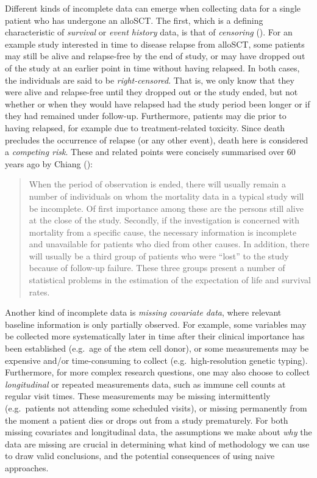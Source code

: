 \documentclass[
  letterpaper,
  paper=240mm:170mm,
  twoside=true,
  open=right,
  fontsize=10pt,
  pagesize=false,
  BCOR=15mm,
  DIV=14,
  headinclude=true,
  footinclude=false,
  headsepline=on]{scrbook}
\begin{document}
Different kinds of incomplete data can emerge when collecting data for a
single patient who has undergone an alloSCT. The first, which is a
defining characteristic of \emph{survival} or \emph{event history} data,
is that of \emph{censoring} (). For an example study interested in time to disease relapse
from alloSCT, some patients may still be alive and relapse-free by the
end of study, or may have dropped out of the study at an earlier point
in time without having relapsed. In both cases, the individuals are said
to be \emph{right-censored}. That is, we only know that they were alive
and relapse-free until they dropped out or the study ended, but not
whether or when they would have relapsed had the study period been
longer or if they had remained under follow-up. Furthermore, patients
may die prior to having relapsed, for example due to treatment-related
toxicity. Since death precludes the occurrence of relapse (or any other
event), death here is considered a \emph{competing risk}. These and
related points were concisely summarised over 60 years ago by Chiang
():

\begin{quote}
When the period of observation is ended, there will usually remain a
number of individuals on whom the mortality data in a typical study will
be incomplete. Of first importance among these are the persons still
alive at the close of the study. Secondly, if the investigation is
concerned with mortality from a specific cause, the necessary
information is incomplete and unavailable for patients who died from
other causes. In addition, there will usually be a third group of
patients who were ``lost'' to the study because of follow-up failure.
These three groups present a number of statistical problems in the
estimation of the expectation of life and survival rates.
\end{quote}

Another kind of incomplete data is \emph{missing covariate data}, where
relevant baseline information is only partially observed. For example,
some variables may be collected more systematically later in time after
their clinical importance has been established (e.g.~age of the stem
cell donor), or some measurements may be expensive and/or time-consuming
to collect (e.g.~high-resolution genetic typing). Furthermore, for more
complex research questions, one may also choose to collect
\emph{longitudinal} or repeated measurements data, such as immune cell
counts at regular visit times. These measurements may be missing
intermittently (e.g.~patients not attending some scheduled visits), or
missing permanently from the moment a patient dies or drops out from a
study prematurely. For both missing covariates and longitudinal data,
the assumptions we make about \emph{why} the data are missing are
crucial in determining what kind of methodology we can use to draw valid
conclusions, and the potential consequences of using naive approaches.
\end{document}
